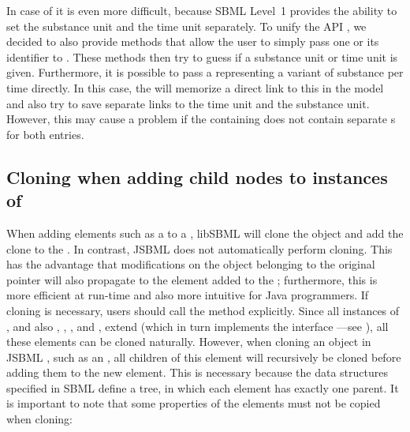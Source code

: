 In case of \KineticLaw it is even more difficult, because SBML
Level~1 provides the ability to set the substance unit
and the time unit separately. To unify the API
, we decided to also provide methods that
allow the user to simply pass one \UnitDefinition or its identifier to
\KineticLaw.  These methods then try to guess if a substance unit or time
unit is given. Furthermore, it is possible to pass a \UnitDefinition
representing a variant of substance per time directly. In this case, the
\KineticLaw will memorize a direct link to this \UnitDefinition in the
model and also try to save separate links to the time unit and
the substance unit. However, this may cause a problem if the containing
\Model does not contain separate \UnitDefinition{}s for both entries.


\subsection{Cloning when adding child nodes to instances of }

When adding elements such as a \Species to a \Model, libSBML 
will clone the object and add the clone to the \Model. In contrast, JSBML
does not automatically perform cloning. This has the advantage that
modifications on the object belonging to the original pointer will also
propagate to the element added to the \Model; furthermore, this is more
efficient at run-time and also more intuitive for Java programmers. If
cloning is necessary, users should call the  method
explicitly. Since all instances of \SBase, and also \Annotation, \ASTNode,
\CVTerm, and \History, extend \AbstractTreeNode (which in turn implements the
interface \Cloneable---see ), all these elements can
be cloned naturally.  However, when cloning an object in JSBML
, such as an \AbstractNamedSBase, all children of this element
will recursively be cloned before adding them to the new element. This is
necessary because the data structures specified in SBML
 define a tree, in which each element has
exactly one parent. It is important to note that some properties of the
elements must not be copied when cloning:


